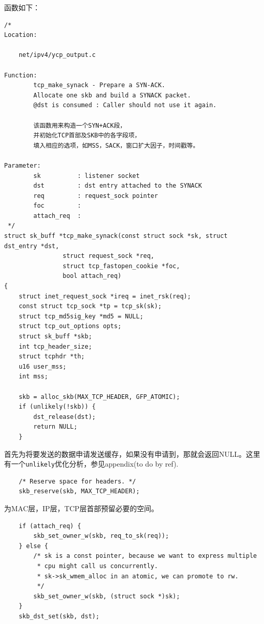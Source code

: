                 函数如下：

\begin{verbatim}
/*
Location:

	net/ipv4/ycp_output.c

Function:
        tcp_make_synack - Prepare a SYN-ACK.
        Allocate one skb and build a SYNACK packet.
        @dst is consumed : Caller should not use it again.

		该函数用来构造一个SYN+ACK段，
		并初始化TCP首部及SKB中的各字段项，
		填入相应的选项，如MSS，SACK，窗口扩大因子，时间戳等。

Parameter:
        sk          : listener socket
        dst         : dst entry attached to the SYNACK
        req         : request_sock pointer
        foc         :
        attach_req  :
 */
struct sk_buff *tcp_make_synack(const struct sock *sk, struct dst_entry *dst,
                struct request_sock *req,
                struct tcp_fastopen_cookie *foc,
                bool attach_req)
{
    struct inet_request_sock *ireq = inet_rsk(req);
    const struct tcp_sock *tp = tcp_sk(sk);
    struct tcp_md5sig_key *md5 = NULL;
    struct tcp_out_options opts;
    struct sk_buff *skb;
    int tcp_header_size;
    struct tcphdr *th;
    u16 user_mss;
    int mss;

    skb = alloc_skb(MAX_TCP_HEADER, GFP_ATOMIC);
    if (unlikely(!skb)) {
        dst_release(dst);
        return NULL;
    }
\end{verbatim}

                首先为将要发送的数据申请发送缓存，如果没有申请到，那就会返回NULL。这里有一个\texttt{unlikely}优化分析，参见appendix(to do by ref).

\begin{verbatim}
    /* Reserve space for headers. */
    skb_reserve(skb, MAX_TCP_HEADER);
\end{verbatim}

                为MAC层，IP层，TCP层首部预留必要的空间。

\begin{verbatim}
    if (attach_req) {
        skb_set_owner_w(skb, req_to_sk(req));
    } else {
        /* sk is a const pointer, because we want to express multiple
         * cpu might call us concurrently.
         * sk->sk_wmem_alloc in an atomic, we can promote to rw.
         */
        skb_set_owner_w(skb, (struct sock *)sk);
    }
    skb_dst_set(skb, dst);
\end{verbatim}

